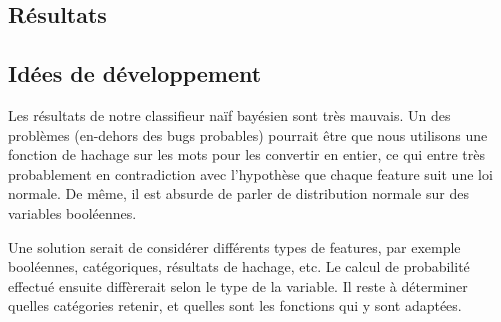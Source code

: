 \documentclass[french, 14pt]{memoir}
\begin{document}
\subsection{Résultats}


\subsection{Idées de développement}

Les résultats de notre classifieur naïf bayésien sont très mauvais. Un des problèmes (en-dehors des bugs probables) pourrait être que nous utilisons une fonction de hachage sur les mots pour les convertir en entier, ce qui entre très probablement en contradiction avec l'hypothèse que chaque feature suit une loi normale. De même, il est absurde de parler de distribution normale sur des variables booléennes.

Une solution serait de considérer différents types de features, par exemple booléennes, catégoriques, résultats de hachage, etc. Le calcul de probabilité effectué ensuite diffèrerait selon le type de la variable. Il reste à déterminer quelles catégories retenir, et quelles sont les fonctions qui y sont adaptées.
\end{document}
